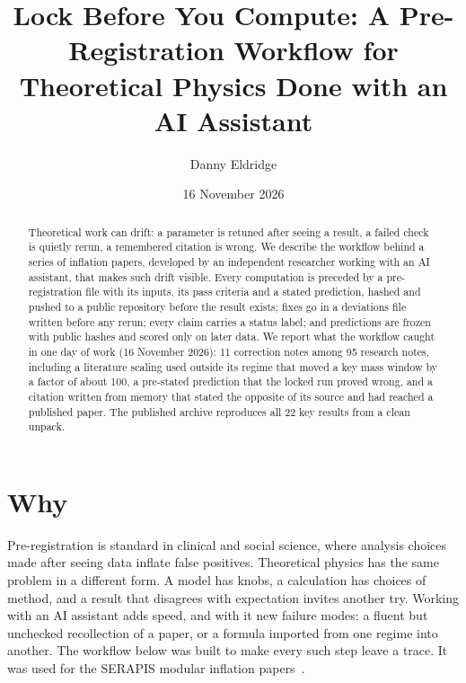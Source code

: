 \documentclass[aps,prd,twocolumn,superscriptaddress,nofootinbib,showkeys]{revtex4-2}
\begin{document}
\title{Lock Before You Compute: A Pre-Registration Workflow for Theoretical Physics Done with an AI Assistant}
\author{Danny Eldridge}
\date{16 November 2026}
\begin{abstract}
Theoretical work can drift: a parameter is retuned after seeing a result, a failed check is quietly rerun, a remembered citation is wrong. We describe the workflow behind a series of inflation papers, developed by an independent researcher working with an AI assistant, that makes such drift visible. Every computation is preceded by a pre-registration file with its inputs, its pass criteria and a stated prediction, hashed and pushed to a public repository before the result exists; fixes go in a deviations file written before any rerun; every claim carries a status label; and predictions are frozen with public hashes and scored only on later data. We report what the workflow caught in one day of work (16 November 2026): 11 correction notes among 95 research notes, including a literature scaling used outside its regime that moved a key mass window by a factor of about 100, a pre-stated prediction that the locked run proved wrong, and a citation written from memory that stated the opposite of its source and had reached a published paper. The published archive reproduces all 22 key results from a clean unpack.
\end{abstract}
\maketitle

\section{Why}
Pre-registration is standard in clinical and social science, where analysis choices made after seeing data inflate false positives. Theoretical physics has the same problem in a different form. A model has knobs, a calculation has choices of method, and a result that disagrees with expectation invites another try. Working with an AI assistant adds speed, and with it new failure modes: a fluent but unchecked recollection of a paper, or a formula imported from one regime into another. The workflow below was built to make every such step leave a trace. It was used for the SERAPIS modular inflation papers~\cite{SERAPIS,P1,P2,P3}.
\end{document}
